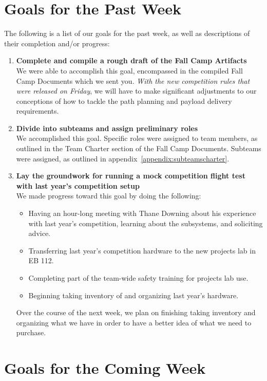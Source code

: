 \documentclass[]{../auvsi_doc}
\begin{document}
\section{Goals for the Past Week}

The following is a list of our goals for the past week, as well as descriptions of their completion and/or progress:

\begin{enumerate}
\item \textbf{Complete and compile a rough draft of the Fall Camp Artifacts}\\
We were able to accomplish this goal, encompassed in the compiled Fall Camp Documents which we sent you. \textit{With the new competition rules that were released on Friday}, we will have to make significant adjustments to our conceptions of how to tackle the path planning and payload delivery requirements.
\item \textbf{Divide into subteams and assign preliminary roles}\\
We accomplished this goal. Specific roles were assigned to team members, as outlined in the Team Charter section of the Fall Camp Documents. Subteams were assigned, as outlined in appendix~\ref{appendix:subteamscharter}.
\item \textbf{Lay the groundwork for running a mock competition flight test with last year's competition setup}\\
We made progress toward this goal by doing the following:
\begin{itemize}
\item Having an hour-long meeting with Thane Downing about his experience with last year's competition, learning about the subsystems, and soliciting advice.
\item Transferring last year's competition hardware to the new projects lab in EB 112.
\item Completing part of the team-wide safety training for projects lab use.
\item Beginning taking inventory of and organizing last year's hardware.
\end{itemize}
Over the course of the next week, we plan on finishing taking inventory and organizing what we have in order to have a better idea of what we need to purchase.
\end{enumerate}

\section{Goals for the Coming Week}
\end{document}
